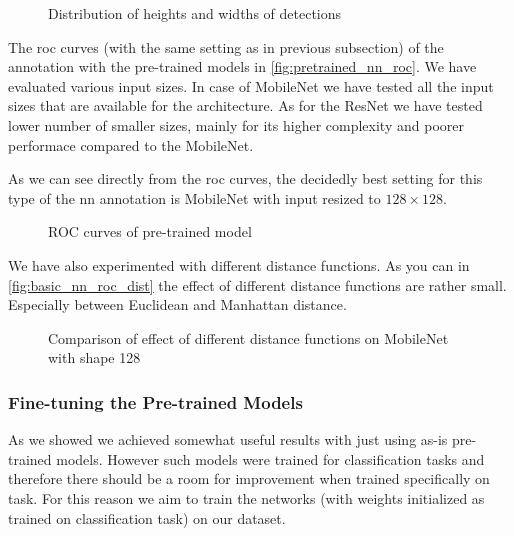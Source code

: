 \begin{figure}
    \centering
    \def\svgwidth{\columnwidth}
    
    \caption{Distribution of heights and widths of detections}
    \label{fig:size_dist}
\end{figure}

The \gls{roc} curves (with the same setting as in previous subsection) of the
annotation with the pre-trained models in \autoref{fig:pretrained_nn_roc}.
We have evaluated various input sizes. In case of MobileNet we have tested
all the input sizes that are available for the architecture. As for the 
ResNet we have tested lower number of smaller sizes, mainly for its higher
complexity and poorer performace compared to the MobileNet.

As we can see directly from the \gls{roc} curves, the decidedly best setting for this type of the \gls{nn} annotation is MobileNet with input resized to $128 \times 128$. 

\begin{figure}
    \centering
    \def\svgwidth{\columnwidth}
    
    \caption{ROC curves of pre-trained model}
    \label{fig:pretrained_nn_roc}
\end{figure}

We have also experimented with different distance functions. As you can in \autoref{fig:basic_nn_roc_dist} the effect of different distance functions are rather small. Especially between Euclidean and Manhattan distance.

\begin{figure}
    \centering
    \def\svgwidth{\columnwidth}
    
    \caption{Comparison of effect of different distance functions on MobileNet with shape 128}
    \label{fig:basic_nn_roc_dist}
\end{figure}

\subsubsection{Fine-tuning the Pre-trained Models}

As we showed we achieved somewhat useful results with just using as-is pre-trained models. However such models were trained for classification tasks and therefore there should be a room for improvement when trained specifically on \reid{} task. For this reason we aim to train the networks (with weights initialized as trained on classification task) on our dataset.

